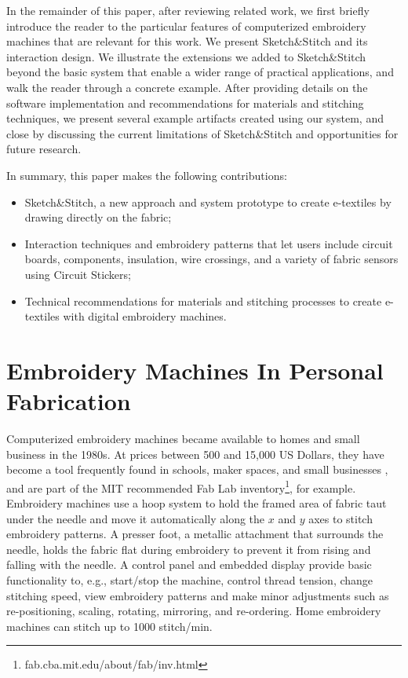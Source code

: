 \documentclass{sigchi}
\begin{document}
In the remainder of this paper, after reviewing related work, we first briefly introduce the reader to the particular features of computerized embroidery machines that are relevant for this work. We present Sketch\&Stitch and its interaction design. We illustrate the extensions we added to Sketch\&Stitch beyond the basic system that enable a wider range of practical applications, and walk the reader through a concrete example. After providing details on the software implementation and recommendations for materials and stitching techniques, we present several example artifacts created using our system, and close by discussing the current limitations of Sketch\&Stitch and opportunities for future research.

In summary, this paper makes the following contributions:
\begin{itemize}
    \item Sketch\&Stitch, a new approach and system prototype to create e-textiles by drawing directly on the fabric;
    \item Interaction techniques and embroidery patterns that let users include circuit boards, components, insulation, wire crossings, and a variety of fabric sensors using Circuit Stickers;
    \item Technical recommendations for materials and stitching processes to create e-textiles with digital embroidery machines.
\end{itemize}








\section{Embroidery Machines In Personal Fabrication}
Computerized embroidery machines became available to homes and small business in the 1980s. At prices between 500 and 15,000 US Dollars, they have become a tool frequently found in schools, maker spaces, and small businesses \cite{lipson2010factory}, and are part of the MIT recommended Fab Lab inventory\footnote{fab.cba.mit.edu/about/fab/inv.html}, for example.
Embroidery machines use a hoop system to hold the framed area of fabric taut under the needle and move it automatically along the $x$ and $y$ axes to stitch embroidery patterns. A presser foot, a metallic attachment that surrounds the needle, holds the fabric flat during embroidery to prevent it from rising and falling with the needle. A control panel and embedded display provide basic functionality to, e.g., start/stop the machine, control thread tension, change stitching speed, view embroidery patterns and make minor adjustments such as re-positioning, scaling, rotating, mirroring, and re-ordering. Home embroidery machines can stitch up to 1000 stitch/min.
\end{document}
